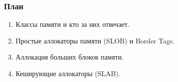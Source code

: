 \begin{frame}
\frametitle{План}

\begin{enumerate}
  \item Классы памяти и кто за них отвечает.
  \item Простые аллокаторы памяти (SLOB) и Border Tags.
  \item Аллокация больших блоков памяти.
  \item Кеширующие аллокаторы (SLAB).
\end{enumerate}
\end{frame}
